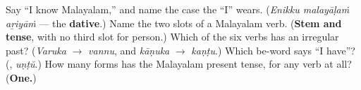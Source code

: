 \begin{tcolorbox}[breakable,colback=teal!4,colframe=teal!35!black,title={Before you move on}]
Say \textquotedblleft{}I know Malayalam,\textquotedblright{} and name the case the \textquotedblleft{}I\textquotedblright{} wears. (\emph{Enikku malayāḷaṁ aṟiyāṁ} — the \textbf{dative}.) Name the two slots of a Malayalam verb. (\textbf{Stem and tense}, with no third slot for person.) Which of the six verbs has an irregular past? (\emph{Varuka} $\to$ \emph{vannu}, and \emph{kāṇuka} $\to$ \emph{kaṇṭu}.) Which be-word says \textquotedblleft{}I have\textquotedblright{}? (\textbf{}, \emph{uṇṭŭ}.) How many forms has the Malayalam present tense, for any verb at all? (\textbf{One.})
\end{tcolorbox}
